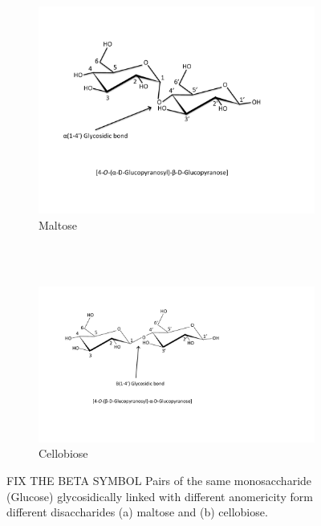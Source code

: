 \documentclass[12pt,a4paper]{article}
\makeatletter
\newcounter{subfloat}
\newcommand{\image}[2]{%
  \stepcounter{subfloat}%
  \begin{tabular}[t]{@{}c@{}}
  #2 \\
  \end{tabular}%
}
\makeatother
\begin{document}

\begin{figure}[ht!]
    \centering
    \begin{subfigure}[t]{1.0\textwidth}
        \centering
        \includegraphics[scale=0.55]{images/glycosidic_linkage_maltose.pdf}
        \caption{Maltose}
    \end{subfigure}%
    \\
    \bigbreak
    ~ 
	\\
    \begin{subfigure}[t]{1.0\textwidth}
        \centering
        \includegraphics[scale=0.55]{images/glycosidic_linkage_cellobiose.pdf}
        \caption{Cellobiose}
    \end{subfigure}
    \caption{FIX THE BETA SYMBOL Pairs of the same monosaccharide (Glucose) glycosidically linked with different anomericity form different disaccharides (a) maltose and (b) cellobiose.}
\label{fig:glycosidic_linkage}
\end{figure}
\end{document}
